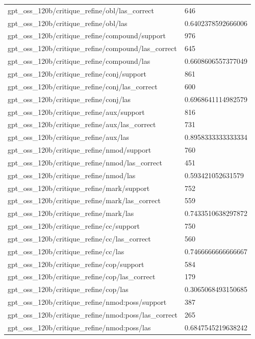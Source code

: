 \begin{tabular}{ll}
gpt\_oss\_120b/critique\_refine/obl/las\_correct & 646 \\
gpt\_oss\_120b/critique\_refine/obl/las & 0.6402378592666006 \\
gpt\_oss\_120b/critique\_refine/compound/support & 976 \\
gpt\_oss\_120b/critique\_refine/compound/las\_correct & 645 \\
gpt\_oss\_120b/critique\_refine/compound/las & 0.6608606557377049 \\
gpt\_oss\_120b/critique\_refine/conj/support & 861 \\
gpt\_oss\_120b/critique\_refine/conj/las\_correct & 600 \\
gpt\_oss\_120b/critique\_refine/conj/las & 0.6968641114982579 \\
gpt\_oss\_120b/critique\_refine/aux/support & 816 \\
gpt\_oss\_120b/critique\_refine/aux/las\_correct & 731 \\
gpt\_oss\_120b/critique\_refine/aux/las & 0.8958333333333334 \\
gpt\_oss\_120b/critique\_refine/nmod/support & 760 \\
gpt\_oss\_120b/critique\_refine/nmod/las\_correct & 451 \\
gpt\_oss\_120b/critique\_refine/nmod/las & 0.593421052631579 \\
gpt\_oss\_120b/critique\_refine/mark/support & 752 \\
gpt\_oss\_120b/critique\_refine/mark/las\_correct & 559 \\
gpt\_oss\_120b/critique\_refine/mark/las & 0.7433510638297872 \\
gpt\_oss\_120b/critique\_refine/cc/support & 750 \\
gpt\_oss\_120b/critique\_refine/cc/las\_correct & 560 \\
gpt\_oss\_120b/critique\_refine/cc/las & 0.7466666666666667 \\
gpt\_oss\_120b/critique\_refine/cop/support & 584 \\
gpt\_oss\_120b/critique\_refine/cop/las\_correct & 179 \\
gpt\_oss\_120b/critique\_refine/cop/las & 0.3065068493150685 \\
gpt\_oss\_120b/critique\_refine/nmod:poss/support & 387 \\
gpt\_oss\_120b/critique\_refine/nmod:poss/las\_correct & 265 \\
gpt\_oss\_120b/critique\_refine/nmod:poss/las & 0.6847545219638242 \\

\end{tabular}
